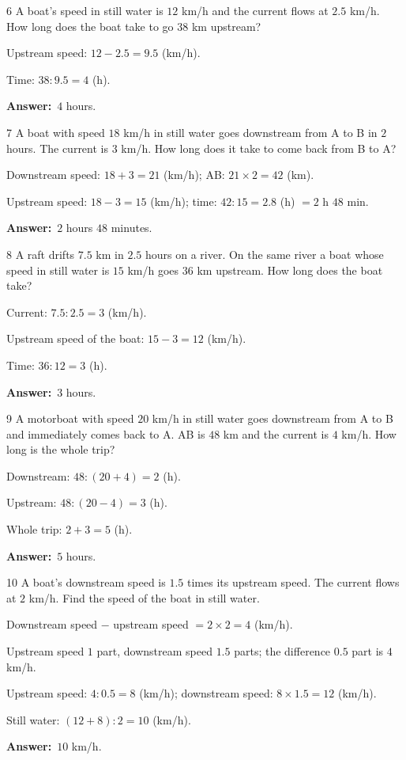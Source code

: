 \documentclass[11pt]{article}
\newif\ifsol \solfalse
\providecommand{\AnsWord}{Đáp số}
\newcommand{\dapso}[1]{\par\textbf{\AnsWord:}\ #1}
\newcommand{\probsol}[1]{%
  \begin{lrbox}{\solmeasure}\begin{minipage}{\dimexpr\linewidth-24pt\relax}#1\end{minipage}\end{lrbox}%
  \ifsol
    \begin{solbox}#1\end{solbox}%
  \else
    \setlength{\solht}{\dimexpr\ht\solmeasure+\dp\solmeasure+0.85cm\relax}%
    \ifdim\solht<1.35cm\setlength{\solht}{1.35cm}\fi
    \begin{tcolorbox}[colback=white,colframe=Line,boxrule=0.8pt,arc=5pt,
      left=8pt,right=8pt,top=4pt,bottom=4pt,height=\solht]{\footnotesize\color{Slate}\itshape\WorkWord}\end{tcolorbox}%
  \fi}
\newcommand{\gap}{\vspace{0.3cm}}
\def\WorkWord{Your work:}
\def\AnsWord{Answer}
\begin{document}
\gap
\begin{probbox}{6}{\relax}
A boat's speed in still water is $12$ km/h and the current flows at $2.5$ km/h. How long does the boat take to go $38$ km upstream?
\end{probbox}
\probsol{
Upstream speed: $12-2.5=9.5$ (km/h).\par Time: $38:9.5=4$ (h).
\dapso{$4$ hours.}}
\gap
\begin{probbox}{7}{\relax}
A boat with speed $18$ km/h in still water goes downstream from A to B in $2$ hours. The current is $3$ km/h. How long does it take to come back from B to A?
\end{probbox}
\probsol{
Downstream speed: $18+3=21$ (km/h); AB: $21\times2=42$ (km).\par
Upstream speed: $18-3=15$ (km/h); time: $42:15=2.8$ (h) $=2$ h $48$ min.
\dapso{$2$ hours $48$ minutes.}}
\gap
\begin{probbox}{8}{\relax}
A raft drifts $7.5$ km in $2.5$ hours on a river. On the same river a boat whose speed in still water is $15$ km/h goes $36$ km upstream. How long does the boat take?
\end{probbox}
\probsol{
Current: $7.5:2.5=3$ (km/h).\par Upstream speed of the boat: $15-3=12$ (km/h).\par Time: $36:12=3$ (h).
\dapso{$3$ hours.}}
\gap
\begin{probbox}{9}{\relax}
A motorboat with speed $20$ km/h in still water goes downstream from A to B and immediately comes back to A. AB is $48$ km and the current is $4$ km/h. How long is the whole trip?
\end{probbox}
\probsol{
Downstream: $48:(20+4)=2$ (h).\par Upstream: $48:(20-4)=3$ (h).\par Whole trip: $2+3=5$ (h).
\dapso{$5$ hours.}}
\gap
\begin{probbox}{10}{\relax}
A boat's downstream speed is $1.5$ times its upstream speed. The current flows at $2$ km/h. Find the speed of the boat in still water.
\end{probbox}
\probsol{
Downstream speed $-$ upstream speed $=2\times2=4$ (km/h).\par
Upstream speed $1$ part, downstream speed $1.5$ parts; the difference $0.5$ part is $4$ km/h.\par
Upstream speed: $4:0.5=8$ (km/h); downstream speed: $8\times1.5=12$ (km/h).\par
Still water: $(12+8):2=10$ (km/h).
\dapso{$10$ km/h.}}
\gap
\end{document}
